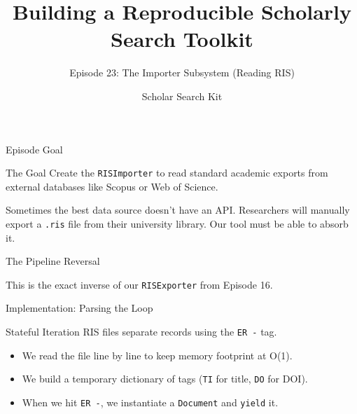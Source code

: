 \documentclass[aspectratio=169]{beamer}
\title{Building a Reproducible Scholarly Search Toolkit}
\subtitle{Episode 23: The Importer Subsystem (Reading RIS)}
\author{Scholar Search Kit}
\date{}
\begin{document}
\begin{frame}[plain]
  \titlepage
\end{frame}

\begin{frame}{Episode Goal}
  \begin{alertblock}{The Goal}
    Create the \texttt{RISImporter} to read standard academic exports from external databases like Scopus or Web of Science.
  \end{alertblock}
  \vspace{0.5cm}
  Sometimes the best data source doesn't have an API. Researchers will manually export a \texttt{.ris} file from their university library. Our tool must be able to absorb it.
\end{frame}

\begin{frame}{The Pipeline Reversal}
  \begin{center}
  \end{center}
  \vspace{0.2cm}
  This is the exact inverse of our \texttt{RISExporter} from Episode 16.
\end{frame}

\begin{frame}{Implementation: Parsing the Loop}
  \begin{block}{Stateful Iteration}
    RIS files separate records using the \texttt{ER  -} tag.
  \end{block}
  
  \begin{itemize}
      \item We read the file line by line to keep memory footprint at O(1).
      \item We build a temporary dictionary of tags (\texttt{TI} for title, \texttt{DO} for DOI).
      \item When we hit \texttt{ER  -}, we instantiate a \texttt{Document} and \texttt{yield} it.
  \end{itemize}
\end{frame}
\end{document}
